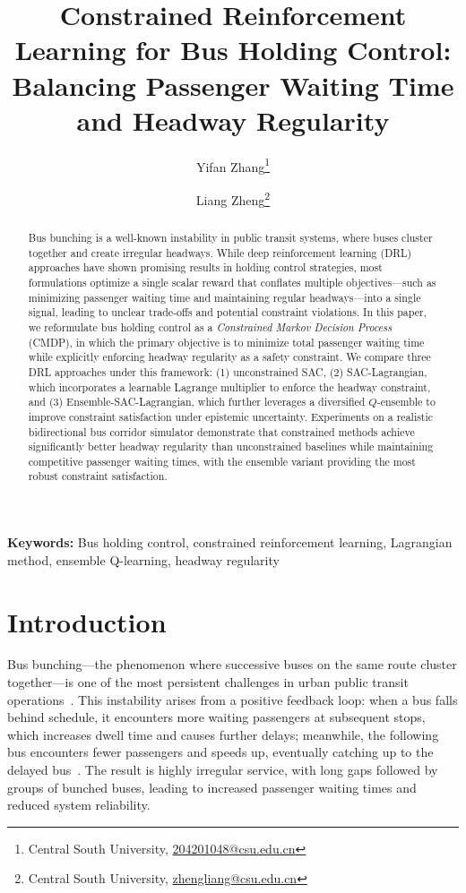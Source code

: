 \documentclass[10pt]{article}
\title{Constrained Reinforcement Learning for Bus Holding Control: Balancing Passenger Waiting Time and Headway Regularity}
\author{
  Yifan Zhang\thanks{Central South University, \href{mailto:204201048@csu.edu.cn}{204201048@csu.edu.cn}} \and
  Liang Zheng\thanks{Central South University, \href{mailto:zhengliang@csu.edu.cn}{zhengliang@csu.edu.cn}}
}
\date{}
\begin{document}
\maketitle

\begin{abstract}
Bus bunching is a well-known instability in public transit systems, where buses cluster together and create irregular headways. While deep reinforcement learning (DRL) approaches have shown promising results in holding control strategies, most formulations optimize a single scalar reward that conflates multiple objectives---such as minimizing passenger waiting time and maintaining regular headways---into a single signal, leading to unclear trade-offs and potential constraint violations. In this paper, we reformulate bus holding control as a \emph{Constrained Markov Decision Process} (CMDP), in which the primary objective is to minimize total passenger waiting time while explicitly enforcing headway regularity as a safety constraint. We compare three DRL approaches under this framework: (1) unconstrained SAC, (2) SAC-Lagrangian, which incorporates a learnable Lagrange multiplier to enforce the headway constraint, and (3) Ensemble-SAC-Lagrangian, which further leverages a diversified $Q$-ensemble to improve constraint satisfaction under epistemic uncertainty. Experiments on a realistic bidirectional bus corridor simulator demonstrate that constrained methods achieve significantly better headway regularity than unconstrained baselines while maintaining competitive passenger waiting times, with the ensemble variant providing the most robust constraint satisfaction.
\end{abstract}

\textbf{Keywords:} Bus holding control, constrained reinforcement learning, Lagrangian method, ensemble Q-learning, headway regularity

\section{Introduction}
\label{sec:intro}

Bus bunching---the phenomenon where successive buses on the same route cluster together---is one of the most persistent challenges in urban public transit operations~\cite{Daganzo2009Headway}. This instability arises from a positive feedback loop: when a bus falls behind schedule, it encounters more waiting passengers at subsequent stops, which increases dwell time and causes further delays; meanwhile, the following bus encounters fewer passengers and speeds up, eventually catching up to the delayed bus~\cite{Xuan2011Dynamic}. The result is highly irregular service, with long gaps followed by groups of bunched buses, leading to increased passenger waiting times and reduced system reliability.
\end{document}
